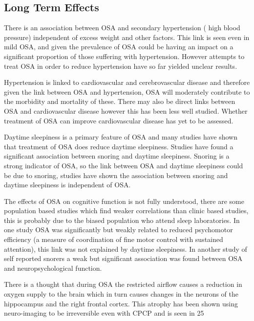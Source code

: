 \subsection{Long Term Effects}

There is an association between OSA and secondary hypertension ( high blood pressure) independent of excess weight and other factors. This link is seen even in mild OSA, and given the prevalence of OSA could be having an impact on a significant proportion of those suffering with hypertension. However attempts to treat OSA in order to reduce hypertension have so far yielded unclear results. 

Hypertension is linked to cardiovascular and cerebrovascular disease and therefore given the link between OSA and hypertension, OSA will moderately contribute to the morbidity and mortality of these. There may also be direct links between OSA and cardiovascular disease however this has been less well studied. Whether treatment of OSA can improve cardiovascular disease has yet to be assessed. 

Daytime sleepiness is a primary feature of OSA and many studies have shown that treatment of OSA does reduce daytime sleepiness. Studies have found a significant association between snoring and daytime sleepiness. Snoring is a strong indicator of OSA, so the link between OSA and daytime sleepiness could be due to snoring, studies have shown the association between snoring and daytime sleepiness is independent of OSA. 

The effects of OSA on cognitive function is not fully understood, there are some population based studies which find weaker correlations than clinic based studies, this is probably due to the biased population who attend sleep laboratories. In one study OSA was significantly but weakly related to reduced psychomotor efficiency (a measure of coordination of fine motor control with sustained attention), this link was not explained by daytime sleepiness. In another study of self reported snorers a weak but significant association was found between OSA and neuropsychological function.

There is a thought that during OSA the restricted airflow causes a reduction in oxygen supply to the brain which in turn causes changes in the neurons of the hippocampus and the right frontal cortex. This atrophy has been shown using neuro-imaging to be irreversible even with CPCP and is seen in 25%

